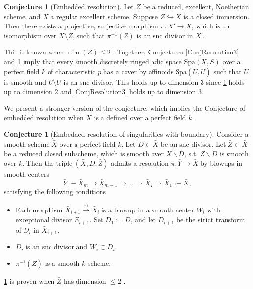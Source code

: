 \documentclass{amsart}
\def\Spa{\textrm{Spa}}
\theoremstyle{definition}
\newtheorem{conjecture}[theorem]{Conjecture}
\numberwithin{equation}{section}
\begin{document}
\begin{conjecture}[Embedded resolution]\label{ConjResolution2}
	Let $Z$ be a reduced, excellent, Noetherian scheme, and $X$ a regular excellent scheme. Suppose $Z \hookrightarrow X$ is a closed immersion. Then there exists a projective, surjective morphism $\pi: X' \to X$, which is an isomorphism over $X \setminus Z$, such that $\pi^{-1}(Z)$ is an snc divisor in $X'$.
\end{conjecture}

 This is known when $\dim(Z) \leq 2$ \cite[Corollary 1.5]{Resolution2}. Together, Conjectures \ref{ConjResolution3} and \ref{ConjResolution2} imply that every smooth discretely ringed adic space $\Spa(X, S)$ over a perfect field $k$ of characteristic $p$ has a cover by affinoids $\Spa(U, \bar{U})$ such that $\bar{U}$ is smooth and $\bar{U} \setminus U$ is an snc divisor.
 This holds up to dimension $3$ since \cref{ConjResolution2} holds up to dimension $2$ and \cref{ConjResolution3} holds up to dimension $3$.

We present a stronger version of the conjecture, which implies the Conjecture of embedded resolution when $X$ is a defined over a perfect field $k$.
\begin{conjecture}[Embedded resolution of singularities with boundary]\label{GeneralResolution}
	Consider a smooth scheme $\bar{X}$ over a perfect field $k$. Let $D\subset \bar{X}$ be an snc divisor. Let $\bar{Z}\subset \bar{X}$ be a reduced closed subscheme, which is smooth over $\bar{X}\backslash D$, s.t. $\bar{Z}\backslash D$ is smooth over $k$. Then the triple $(\bar{X},D,\bar{Z})$ admits a resolution $\pi:\bar{Y}\to \bar{X}$ by blowups in smooth centers
	\[
	\bar{Y}:=\bar{X}_m\to \bar{X}_{m-1}\to \dots \to \bar{X}_2 \to \bar{X}_1:=\bar{X},
	\]
	satisfying the following conditions
	\begin{itemize}
		\item Each morphism $\bar{X}_{i+1}\xrightarrow{\pi_i} \bar{X}_{i}$ is a blowup in a smooth center $W_i$ with exceptional divisor $E_{i+1}$. Set $D_1:=D$, and let $D_{i+1}$ be the strict transform of $D_i$ in $\bar{X}_{i+1}$.
		\item $D_{i}$ is an snc divisor and $W_i \subset D_i$.
		\item $\pi^{-1}(\bar{Z})$ is a smooth $k$-scheme.
	\end{itemize}
\end{conjecture}
\cref{GeneralResolution} is proven when $\bar{Z}$ has dimension $\leq 2$ \cite[Theorem 6.9]{Resolution2}. 
\end{document}

